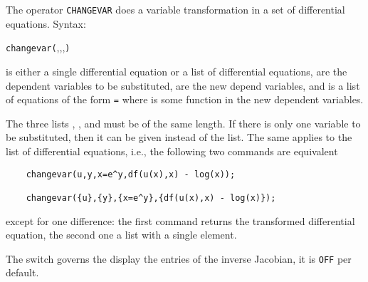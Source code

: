 The operator \texttt{CHANGEVAR} does a variable transformation in a set of 
differential equations.
Syntax:
\begin{syntaxtable}
   \texttt{changevar(},,,\texttt{)}
\end{syntaxtable}
 is either a single differential equation or a list of
differential equations,  are the dependent variables to
be substituted,  are the new depend variables, and
 is a list of equations of the form 
\texttt{=}  where  is some function
in the new dependent variables.

The three lists , , and  must
be of the same length. If there is only one variable to be
substituted, then it can be given instead of the list. The same applies to the list
of differential equations, i.e., the following two
commands are equivalent
\begin{verbatim}
    changevar(u,y,x=e^y,df(u(x),x) - log(x));

    changevar({u},{y},{x=e^y},{df(u(x),x) - log(x)});
\end{verbatim}
except for one difference: the first command returns the transformed differential
equation, the second one a list with a single element.

\hypertarget{switch:DISPJACOBIAN}{}
The switch  governs the display the entries of the inverse Jacobian,
it is \texttt{OFF} per default.

